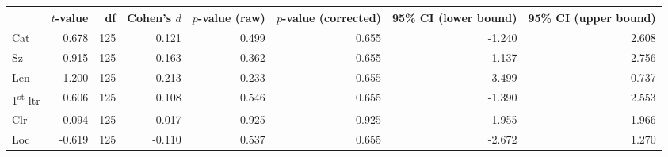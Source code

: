 \begin{tabular}{lrrrrrrr}
\toprule
 & $t$-value & df & Cohen's $d$ & $p$-value (raw) & $p$-value (corrected) & 95\% CI (lower bound) & 95\% CI (upper bound) \\
\midrule
 Cat & 0.678 & 125 & 0.121 & 0.499 & 0.655 & -1.240 & 2.608 \\
 Sz & 0.915 & 125 & 0.163 & 0.362 & 0.655 & -1.137 & 2.756 \\
 Len & -1.200 & 125 & -0.213 & 0.233 & 0.655 & -3.499 & 0.737 \\
 1\textsuperscript{st} ltr & 0.606 & 125 & 0.108 & 0.546 & 0.655 & -1.390 & 2.553 \\
 Clr & 0.094 & 125 & 0.017 & 0.925 & 0.925 & -1.955 & 1.966 \\
 Loc & -0.619 & 125 & -0.110 & 0.537 & 0.655 & -2.672 & 1.270 \\
\bottomrule
\end{tabular}